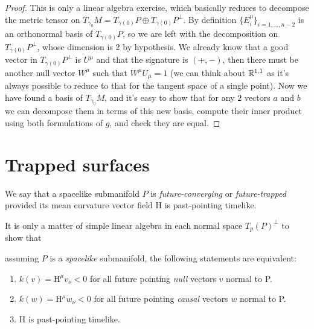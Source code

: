 \begin{proof}
	This is only a linear algebra exercise, which basically reduces to decompose the metric tensor on \(T_{\gamma_0}M = T_{\gamma(0)}P \oplus T_{\gamma(0)}P^{\perp}\). By definition \(\{E_i^{\mu}\}_{i = 1, \ldots, n - 2}\) is an orthonormal basis of \(T_{\gamma(0)}P\), so we are left with the decomposition on \(T_{\gamma(0)}P^{\perp}\), whose dimension is \(2\) by hypothesis.
	We already know that a good vector in \(T_{\gamma(0)}P^{\perp}\) is \(U^{\mu}\) and that the signature is \((+, -)\), then there must be another null vector \(W^{\mu}\) such that \(W^{\mu}U_{\mu} = 1\) (we can think about \({\mathbb{R}}^{1,1}\) as it's always possible to reduce to that for the tangent space of a single point). Now we have found a basis of \(T_{\gamma_0}M\), and it's easy to show that for any \(2\) vectors \(a\) and \(b\) we can decompose them in terms of this new basis, compute their inner product using both formulations of \(g\), and check they are equal.
\end{proof}

\section{Trapped surfaces}

\begin{definition}
	\label{def:trapped-surface}
	We say that a spacelike submanifold \(P\) is \emph{future-converging} or \emph{future-trapped} provided its mean curvature vector field \(\mathrm{H}\) is past-pointing timelike.
\end{definition}


It is only a matter of simple linear algebra in each normal space \(T_p(P)^{\perp}\) to show that
\begin{lemma} \label{lemma:charact-trapped}
	assuming \(P\) is a \emph{spacelike} submanifold, the following statements are equivalent:
	\begin{enumerate}
		\item  \(k(v) =\mathrm{H}^{\mu} v_{\nu} < 0 \) for all future pointing \emph{null} vectors \(v\) normal to P.
		\item  \(k(w) =\mathrm{H}^{\mu} w_{\nu} < 0 \) for all future pointing \emph{causal} vectors \(w\) normal to P.
		\item \(\mathrm{H}\) is past-pointing timelike.
	\end{enumerate}
\end{lemma}

